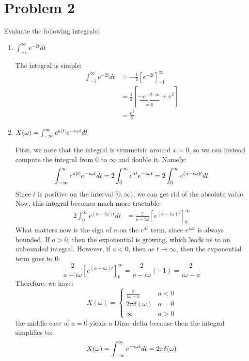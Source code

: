 \documentclass[10pt]{article}
\begin{document}
	\section*{Problem 2}
	Evaluate the following integrals:
	\begin{enumerate}[label=\alph*)]
		\item \( \int_{-1}^{\infty} e^{-2t}dt \) 
			\begin{solution}
				The integral is simple:
				\begin{align*}
					\int_{-1}^{\infty}e^{-2t} dt &= -\frac{1}{2}\left[ e^{-2t} \right]_{-1}^{\infty} \\
					&= \frac{1}{2}\left[ \underbrace{-e^{-2 \cdot \infty}}_{= 0} + e^2 \right]  \\
					&= \frac{e^2}{2}
				\end{align*}
			\end{solution}
		\item \( X(\omega) = \int_{-\infty}^{\infty} e^{a |t|} e^{-i \omega t} dt \)

			\begin{solution}
				First, we note that the integral is symmetric around \( x = 0 \), so we can instead compute 
				the integral from 0 to \( \infty \) and double it. Namely:
				\[
				\int_{-\infty}^{\infty} e^{a|t|}e^{-i \omega t}dt = 2\int_{0}^{\infty}e^{at}e^{-i \omega t } = 2 \int_0^{\infty}
				e^{(a - i \omega)t} dt
				\] 
				Since \( t \) is positive on the interval \( [0, \infty) \), we can get rid of the absolute 
				value. Now, this integral becomes much more tractable:
				\begin{align*}
					2\int_{0}^{\infty} e^{(a - i \omega)t} dt &= 
					\frac{2}{a - i \omega}\left[ e^{(a - i \omega)t} \right] _{0}^{\infty}
				\end{align*}
				What matters now is the sign of \( a \) on the \( e^{at} \) term, since \( e^{i \omega t} \) is 
				always bounded. If \( a > 0 \), then the exponential is growing, which 
				leads us to an unbounded integral. However, if \( a < 0 \), then as  \( t \to \infty \), then the 
				exponential term goes to 0:
				\[
				\frac{2}{a - i \omega}\left[ e^{(a - i \omega)t} \right]_{0}^{\infty} = \frac{2}{a - i \omega}
				(-1) = \frac{2}{i\omega - a}
				\] 
				Therefore, we have:
				\[
					X(\omega) = \begin{cases}
						\frac{2}{i \omega - a} & a < 0\\
						2\pi\delta(\omega) & a = 0\\
						\infty & a > 0
					\end{cases}
				\] 
				the middle case of \( a = 0 \) yields a Dirac delta because then the integral simplifies to:
				\[
				X(\omega) = \int_{-\infty}^{\infty} e^{-i \omega t} dt = 2\pi\delta(\omega)
				\] 
			\end{solution}
	\end{enumerate}
	\pagebreak
\end{document}
